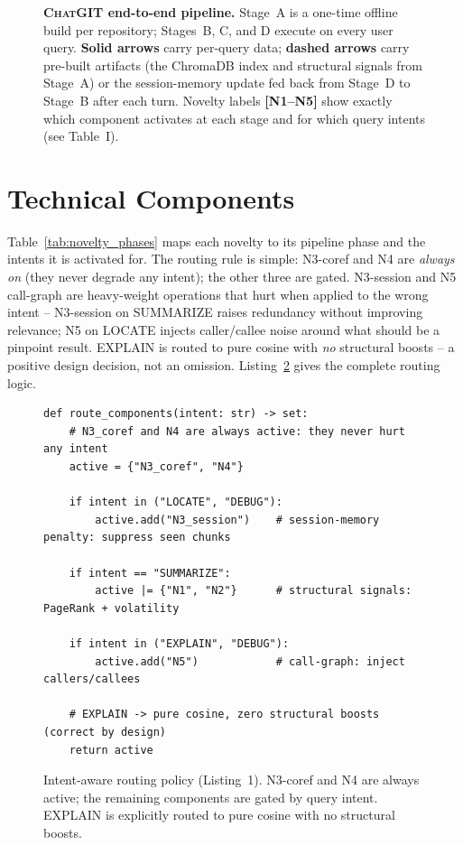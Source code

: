 \documentclass[conference]{IEEEtran}
\newcommand{\chatgit}{\textsc{ChatGIT}\xspace}
\begin{document}
\begin{figure}[t]
\begin{tikzpicture}
\end{tikzpicture}
\caption{\textbf{\chatgit end-to-end pipeline.}
Stage~A is a one-time offline build per repository;
Stages~B, C, and D execute on every user query.
\textbf{Solid arrows} carry per-query data; \textbf{dashed arrows} carry
pre-built artifacts (the ChromaDB index and structural signals from Stage~A)
or the session-memory update fed back from Stage~D to Stage~B after each turn.
Novelty labels \textbf{[N1--N5]} show exactly which component activates at
each stage and for which query intents (see Table~I).}
\label{fig:pipeline}
\end{figure}

\section{Technical Components}

Table~\ref{tab:novelty_phases} maps each novelty to its pipeline phase
and the intents it is activated for. The routing rule is simple: N3-coref
and N4 are \emph{always on} (they never degrade any intent); the other
three are gated. N3-session and N5 call-graph are heavy-weight operations
that hurt when applied to the wrong intent -- N3-session on SUMMARIZE
raises redundancy without improving relevance; N5 on LOCATE injects
caller/callee noise around what should be a pinpoint result. EXPLAIN is
routed to pure cosine with \emph{no} structural boosts -- a positive
design decision, not an omission. Listing~\ref{lst:routing} gives the
complete routing logic.

\begin{figure}[t]
\begin{lstlisting}
def route_components(intent: str) -> set:
    # N3_coref and N4 are always active: they never hurt any intent
    active = {"N3_coref", "N4"}

    if intent in ("LOCATE", "DEBUG"):
        active.add("N3_session")    # session-memory penalty: suppress seen chunks

    if intent == "SUMMARIZE":
        active |= {"N1", "N2"}      # structural signals: PageRank + volatility

    if intent in ("EXPLAIN", "DEBUG"):
        active.add("N5")            # call-graph: inject callers/callees

    # EXPLAIN -> pure cosine, zero structural boosts (correct by design)
    return active
\end{lstlisting}
\caption{Intent-aware routing policy (Listing~1). N3-coref and N4 are always
active; the remaining components are gated by query intent. EXPLAIN is
explicitly routed to pure cosine with no structural boosts.}
\label{lst:routing}
\end{figure}
\end{document}
